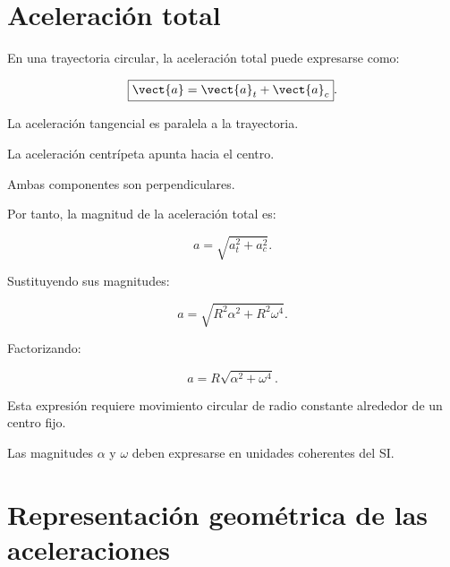 \section{Aceleración total}

En una trayectoria circular, la aceleración total puede expresarse como:

\[
\boxed{
\vect{a}
=
\vect{a}_t+\vect{a}_c
}.
\]

La aceleración tangencial es paralela a la trayectoria.

La aceleración centrípeta apunta hacia el centro.

Ambas componentes son perpendiculares.

Por tanto, la magnitud de la aceleración total es:

\[
\boxed{
a=\sqrt{a_t^2+a_c^2}
}.
\]

Sustituyendo sus magnitudes:

\[
\boxed{
a
=
\sqrt{
R^2\alpha^2+R^2\omega^4
}
}.
\]

Factorizando:

\[
\boxed{
a
=
R\sqrt{\alpha^2+\omega^4}
}.
\]

\begin{condicion}

Esta expresión requiere movimiento circular de radio constante alrededor de
un centro fijo.

Las magnitudes \(\alpha\) y \(\omega\) deben expresarse en unidades coherentes
del SI.

\end{condicion}


\section{Representación geométrica de las aceleraciones}

